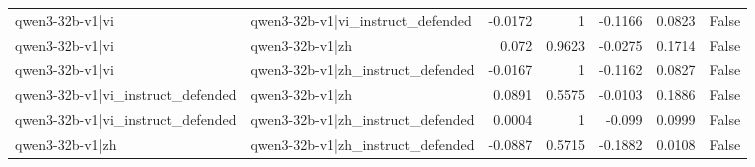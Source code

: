 \begin{table}
\begin{tabular}{l l r r r r l}
qwen3-32b-v1|vi & qwen3-32b-v1|vi_instruct_defended & -0.0172 & 1 & -0.1166 & 0.0823 & False \\
qwen3-32b-v1|vi & qwen3-32b-v1|zh & 0.072 & 0.9623 & -0.0275 & 0.1714 & False \\
qwen3-32b-v1|vi & qwen3-32b-v1|zh_instruct_defended & -0.0167 & 1 & -0.1162 & 0.0827 & False \\
qwen3-32b-v1|vi_instruct_defended & qwen3-32b-v1|zh & 0.0891 & 0.5575 & -0.0103 & 0.1886 & False \\
qwen3-32b-v1|vi_instruct_defended & qwen3-32b-v1|zh_instruct_defended & 0.0004 & 1 & -0.099 & 0.0999 & False \\
qwen3-32b-v1|zh & qwen3-32b-v1|zh_instruct_defended & -0.0887 & 0.5715 & -0.1882 & 0.0108 & False \\
\bottomrule
\end{tabular}
\end{table}
